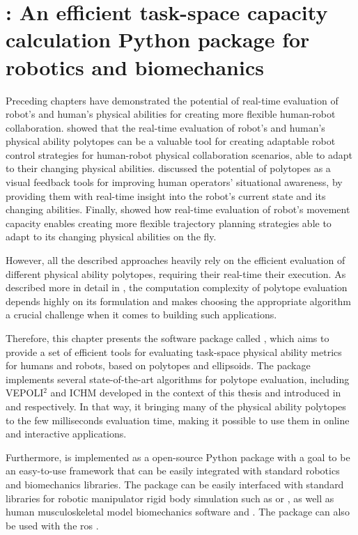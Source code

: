 \chapter{: An efficient task-space capacity calculation Python package for robotics and biomechanics}
\label{ch:software}

Preceding chapters have demonstrated the potential of real-time evaluation of robot's and human's physical abilities for creating more flexible human-robot collaboration.  showed that the real-time evaluation of robot's and human's physical ability polytopes can be a valuable tool for creating adaptable robot control strategies for human-robot physical collaboration scenarios, able to adapt to their changing physical abilities.   discussed the potential of polytopes as a visual feedback tools for improving human operators' situational awareness, by providing them with real-time insight into the robot's current state and its changing abilities. Finally,  showed how real-time evaluation of robot's movement capacity enables creating more flexible trajectory planning strategies able to adapt to its changing physical abilities on the fly. 

However, all the described approaches heavily rely on the efficient evaluation of different physical ability polytopes, requiring their 
real-time their execution. As described more in detail in , the computation complexity of polytope evaluation depends highly on its formulation and makes choosing the appropriate algorithm a crucial challenge when it comes to building such applications. 

Therefore, this chapter presents the software package called , which aims to provide a set of efficient tools for evaluating task-space physical ability metrics for humans and robots, based on polytopes and ellipsoids. The package implements several state-of-the-art algorithms for polytope evaluation, including VEPOLI$^2$ and ICHM developed in the context of this thesis and introduced in  and  respectively. In that way, it bringing many of the physical ability polytopes to the few milliseconds evaluation time, making it possible to use them in online and interactive applications. 

Furthermore,  is implemented as a open-source Python package with a goal to be an easy-to-use framework that can be easily integrated with standard robotics and biomechanics libraries. The package can be easily interfaced with standard libraries for robotic manipulator rigid body simulation such as  \cite{rtb} or  \cite{pinocchio2021}, as well as human musculoskeletal model biomechanics software  \cite{opensim} and  \cite{Michaud2021}. The package can also be used with the \gls{ros} \cite{ros}.

